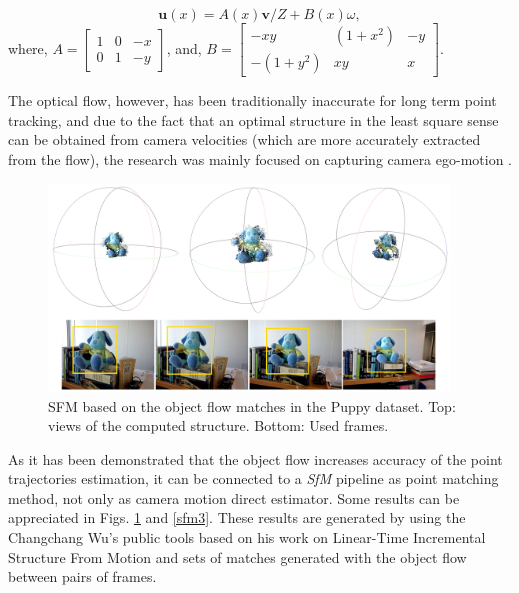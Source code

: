 \begin{equation}
\textbf{u}(x) = A(x)\textbf{v}/Z + B(x)\omega ,
\label{eq_dfc}
\end{equation}
 where, $ A =  \left[ {\begin{array}{ccc} 1 & 0 & -x\\ 0 & 1 & -y \end{array} } \right]$, 
 and, $ B =  \left[ {\begin{array}{ccc} -xy & (1+x^2) & -y\\ -(1+y^2) & xy & x \end{array} } \right]$.


The optical flow, however, has been traditionally 
inaccurate for long term point tracking, and due to the fact that an optimal structure in the least square sense can 
be obtained from camera velocities (which are more accurately extracted from the flow), the research was 
mainly focused on capturing camera ego-motion \cite{c43}. 

   \begin{figure}[tpbh]
      \centering
      \includegraphics[width=0.95\textwidth]{../images/SFM2.png}
      \caption{ SFM based on the object flow matches in the Puppy dataset. Top: views of the computed structure. Bottom: Used frames. }
      \label{sfm2}
   \end{figure}
   
As it has been demonstrated that the object flow 
increases accuracy of the point trajectories estimation, it can be connected to a {\it SfM} 
pipeline as point matching method, not only as camera motion direct estimator. Some results can be appreciated in Figs. \ref{sfm2} and \ref{sfm3}. These results are generated 
by using the Changchang Wu's public tools based on his work on Linear-Time Incremental Structure From Motion \cite{c42} and sets of matches generated 
with the object flow between pairs of frames.
   
